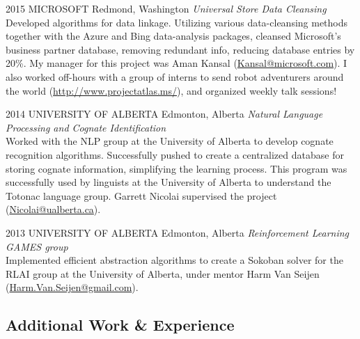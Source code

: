 \documentclass{friggeri-cv} %
\begin{document}
\begin{entrylist}


\entry
{2015}
{MICROSOFT}
{Redmond, Washington}
{\emph{Universal Store Data Cleansing} \\
Developed algorithms for data linkage. Utilizing various data-cleansing methods together with the Azure and Bing data-analysis packages, cleansed Microsoft's business partner database, removing redundant info, reducing database entries by 20\%. My manager for this project was Aman Kansal (\href{mailto:Kansal@microsoft.com}{Kansal@microsoft.com}). I also worked off-hours with a group of interns to send robot adventurers around the world (\href{http://www.projectatlas.ms/}{http://www.projectatlas.ms/}), and organized weekly talk sessions!}


\entry
{2014}
{UNIVERSITY OF ALBERTA}
{Edmonton, Alberta}
{\emph{Natural Language Processing and Cognate Identification} \\
Worked with the NLP group at the University of Alberta to develop cognate recognition algorithms. Successfully pushed to create a centralized database for storing cognate information, simplifying the learning process. This program was successfully used by linguists at the University of Alberta to understand the Totonac language group. Garrett Nicolai supervised the project (\href{mailto:Nicolai@ualberta.ca}{Nicolai@ualberta.ca}).}


\entry
{2013}
{UNIVERSITY OF ALBERTA}
{Edmonton, Alberta}
{\emph{Reinforcement Learning GAMES group} \\
Implemented efficient abstraction algorithms to create a Sokoban solver for the RLAI group at the University of Alberta, under mentor Harm Van Seijen (\href{mailto:Harm.Van.Seijen@gmail.com}{Harm.Van.Seijen@gmail.com}).}


\end{entrylist}

\pagebreak[2]
\subsection{Additional Work \& Experience}
\end{document}
